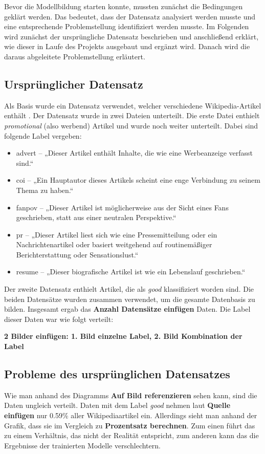 
Bevor die Modellbildung starten konnte, mussten zunächst die Bedingungen geklärt werden. Das bedeutet, dass der Datensatz analysiert werden musste und eine entsprechende Problemstellung identifiziert werden musste. Im Folgenden wird zunächst der ursprüngliche Datensatz beschrieben und anschließend erklärt, wie dieser in Laufe des Projekts ausgebaut und ergänzt wird. Danach wird die daraus abgeleitete Problemstellung erläutert.

\subsection{Ursprünglicher Datensatz}
Als Basis wurde ein Datensatz verwendet, welcher  verschiedene Wikipedia-Artikel enthält \cite{UrsprungDatensatz}. Der Datensatz wurde in zwei Dateien unterteilt. Die erste Datei enthielt \emph{promotional} (also werbend) Artikel und wurde noch weiter unterteilt. Dabei sind folgende Label vergeben:
\begin{itemize}
    \item advert – „Dieser Artikel enthält Inhalte, die wie eine Werbeanzeige verfasst sind.“
\item coi – „Ein Hauptautor dieses Artikels scheint eine enge Verbindung zu seinem Thema zu haben.“
\item fanpov – „Dieser Artikel ist möglicherweise aus der Sicht eines Fans geschrieben, statt aus einer neutralen Perspektive.“
\item pr – „Dieser Artikel liest sich wie eine Pressemitteilung oder ein Nachrichtenartikel oder basiert weitgehend auf routinemäßiger Berichterstattung oder Sensationslust.“
\item resume – „Dieser biografische Artikel ist wie ein Lebenslauf geschrieben.“
\end{itemize}
Der zweite Datensatz enthielt Artikel, die als \emph{good} klassifiziert worden sind. Die beiden Datensätze wurden zusammen verwendet, um die gesamte Datenbasis zu bilden. Insgesamt ergab das \textbf{Anzahl Datensätze einfügen} Daten. Die Label dieser Daten war wie folgt verteilt:


\textbf{2 Bilder einfügen: 1. Bild einzelne Label, 2. Bild Kombination der Label}
\\



\subsection{Probleme des ursprünglichen Datensatzes}
Wie man anhand des Diagramms \textbf{Auf Bild referenzieren} sehen kann, sind die Daten ungleich verteilt. Daten mit dem Label \textit{good} nehmen laut \textbf{Quelle einfügen} nur 0.59\% aller Wikipediaartikel ein. Allerdings sieht man anhand der Grafik, dass sie im Vergleich zu \textbf{Prozentsatz berechnen}. Zum einen führt das zu einem Verhältnis, das nicht der Realität entspricht, zum anderen kann das die Ergebnisse der trainierten Modelle verschlechtern.



